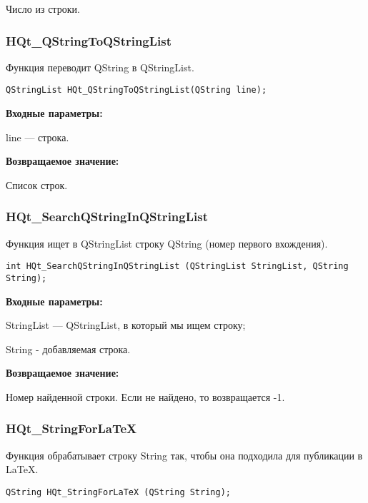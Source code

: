 \documentclass[a4paper,12pt]{article}
\begin{document}
Число из строки.


\subsubsection{HQt\_QStringToQStringList}\label{HQt_QStringToQStringList}

Функция переводит QString в QStringList.


\begin{lstlisting}[label=code_syntax_HQt_QStringToQStringList,caption=Синтаксис]
QStringList HQt_QStringToQStringList(QString line);
\end{lstlisting}

\textbf{Входные параметры:}
 
line --- строка.

\textbf{Возвращаемое значение:}

Список строк.


\subsubsection{HQt\_SearchQStringInQStringList}\label{HQt_SearchQStringInQStringList}

Функция ищет в QStringList строку QString (номер первого вхождения).


\begin{lstlisting}[label=code_syntax_HQt_SearchQStringInQStringList,caption=Синтаксис]
int HQt_SearchQStringInQStringList (QStringList StringList, QString String);
\end{lstlisting}

\textbf{Входные параметры:}
 
StringList --- QStringList, в который мы ищем строку;

String - добавляемая строка.

\textbf{Возвращаемое значение:}

Номер найденной строки. Если не найдено, то возвращается -1.


\subsubsection{HQt\_StringForLaTeX}\label{HQt_StringForLaTeX}

Функция обрабатывает строку String так, чтобы она подходила для публикации в LaTeX.


\begin{lstlisting}[label=code_syntax_HQt_StringForLaTeX,caption=Синтаксис]
QString HQt_StringForLaTeX (QString String);
\end{lstlisting}
\end{document}
